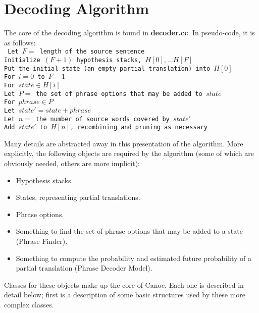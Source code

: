 \documentclass[12pt]{amsart} \usepackage{epsfig} \usepackage{rotating}
\newcommand{\file}{\textbf} \newcommand{\url}{\underline}
\newcommand{\code}{\small\texttt}
\begin{document}
\section{Decoding Algorithm}
The core of the decoding algorithm is found in \file{decoder.cc}.  In
pseudo-code, it is as follows: \\ {\noindent \code{
\noindent
Let $F = $ length of the source sentence\\ Initialize $(F + 1)$ hypothesis
stacks, $H[0], \dots H[F]$\\ Put the initial state (an empty partial
translation) into $H[0]$\\ For $i = 0$ to $F - 1$\\ \indent For $state \in
H[i]$\\ \indent \indent Let $P = $ the set of phrase options that may be added
to $state$\\ \indent \indent For $phrase \in P$\\ \indent \indent \indent Let
$state' = state + phrase$\\ \indent \indent \indent Let $n = $ the number of
source words covered by $state'$\\ \indent \indent \indent Add $state'$ to
$H[n]$, recombining and pruning as necessary } }

Many details are abstracted away in this presentation of the algorithm.  More
explicitly, the following objects are required by the algorithm (some of which
are obviously needed, others are more implicit):

\begin{itemize}

\item
Hypothesis stacks.

\item
States, representing partial translations.

\item
Phrase options.

\item
Something to find the set of phrase options that may be added to a state
(Phrase Finder).

\item
Something to compute the probability and estimated future probability of a
partial translation (Phrase Decoder Model).

\end{itemize}

Classes for these objects make up the core of Canoe.  Each one is described in
detail below; first is a description of some basic structures used by these
more complex classes.
\end{document}
